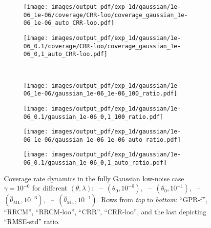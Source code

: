 \documentclass[a4paper,14pt]{extarticle}
\begin{document}
\begin{figure}
\begin{subfigure}[b]{0.25\linewidth}
  \end{subfigure}%
  \begin{subfigure}[b]{0.25\linewidth}
    \texttt{[image: images/output\_pdf/exp\_1d/gaussian/1e-06\_1e-06/coverage/CRR-loo/coverage\_gaussian\_1e-06\_1e-06\_auto\_CRR-loo.pdf]}
  \end{subfigure}%
  \begin{subfigure}[b]{0.25\linewidth}
    \texttt{[image: images/output\_pdf/exp\_1d/gaussian/1e-06\_0.1/coverage/CRR-loo/coverage\_gaussian\_1e-06\_0,1\_auto\_CRR-loo.pdf]}
  \end{subfigure}\\
  \begin{subfigure}[b]{0.25\linewidth}
    \texttt{[image: images/output\_pdf/exp\_1d/gaussian/1e-06\_1e-06/gaussian\_1e-06\_1e-06\_100\_ratio.pdf]}
    \caption{} \label{fig:gaussian_1d_low_noise_c1}
  \end{subfigure}%
  \begin{subfigure}[b]{0.25\linewidth}
    \texttt{[image: images/output\_pdf/exp\_1d/gaussian/1e-06\_0.1/gaussian\_1e-06\_0,1\_100\_ratio.pdf]}
    \caption{} \label{fig:gaussian_1d_low_noise_c2}
  \end{subfigure}%
  \begin{subfigure}[b]{0.25\linewidth}
    \texttt{[image: images/output\_pdf/exp\_1d/gaussian/1e-06\_1e-06/gaussian\_1e-06\_1e-06\_auto\_ratio.pdf]}
    \caption{} \label{fig:gaussian_1d_low_noise_c3}
  \end{subfigure}%
  \begin{subfigure}[b]{0.25\linewidth}
    \texttt{[image: images/output\_pdf/exp\_1d/gaussian/1e-06\_0.1/gaussian\_1e-06\_0,1\_auto\_ratio.pdf]}
    \caption{} \label{fig:gaussian_1d_low_noise_c4}
  \end{subfigure}%
  \caption{Coverage rate dynamics in the fully Gaussian low-noise case $\gamma=10^{-6}$
  for different $(\theta, \lambda)$:
  ~--~$(\theta_0, 10^{-6})$,
  ~--~$(\theta_0, 10^{-1})$,
  ~--~$(\hat{\theta}_\text{ML}, 10^{-6})$,
  ~--~$(\hat{\theta}_\text{ML}, 10^{-1})$.
  Rows from \textit{top} to \textit{bottom}: ``GPR-f'', ``RRCM'', ``RRCM-loo'',
  ``CRR'', ``CRR-loo'', and the last depicting ``RMSE-std'' ratio.}
  \label{fig:gaussian_1d_low_noise}
\end{figure}
\end{document}
